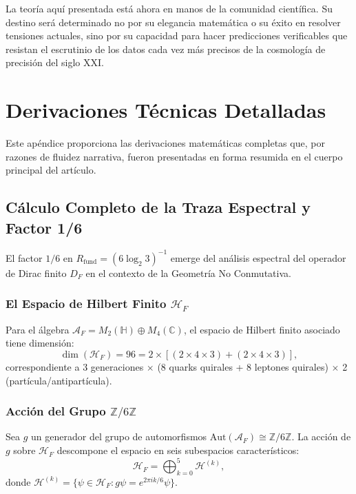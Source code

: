\documentclass[12pt, a4paper]{article}
\theoremstyle{plain}
\theoremstyle{definition}
\begin{document}
La teoría aquí presentada está ahora en manos de la comunidad científica. Su destino será determinado no por su elegancia matemática o su éxito en resolver tensiones actuales, sino por su capacidad para hacer predicciones verificables que resistan el escrutinio de los datos cada vez más precisos de la cosmología de precisión del siglo XXI.

\appendix

\section{Derivaciones Técnicas Detalladas}
\label{app:derivaciones}

Este apéndice proporciona las derivaciones matemáticas completas que, por razones de fluidez narrativa, fueron presentadas en forma resumida en el cuerpo principal del artículo.

\subsection{Cálculo Completo de la Traza Espectral y Factor 1/6}
\label{app:spectral_trace}

El factor $1/6$ en $R_{\text{fund}} = (6\log_2 3)^{-1}$ emerge del análisis espectral del operador de Dirac finito $D_F$ en el contexto de la Geometría No Conmutativa.

\subsubsection{El Espacio de Hilbert Finito $\mathcal{H}_F$}

Para el álgebra $\mathcal{A}_F = M_2(\mathbb{H}) \oplus M_4(\mathbb{C})$, el espacio de Hilbert finito asociado tiene dimensión:
\[
\dim(\mathcal{H}_F) = 96 = 2 \times [(2 \times 4 \times 3) + (2 \times 4 \times 3)],
\]
correspondiente a 3 generaciones $\times$ (8 quarks quirales + 8 leptones quirales) $\times$ 2 (partícula/antipartícula).

\subsubsection{Acción del Grupo $\mathbb{Z}/6\mathbb{Z}$}

Sea $g$ un generador del grupo de automorfismos $\text{Aut}(\mathcal{A}_F) \cong \mathbb{Z}/6\mathbb{Z}$. La acción de $g$ sobre $\mathcal{H}_F$ descompone el espacio en seis subespacios característicos:
\[
\mathcal{H}_F = \bigoplus_{k=0}^{5} \mathcal{H}^{(k)},
\]
donde $\mathcal{H}^{(k)} = \{\psi \in \mathcal{H}_F : g\psi = e^{2\pi i k/6}\psi\}$.
\end{document}

